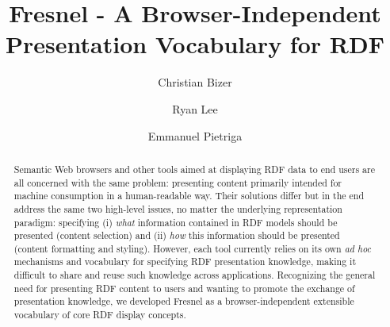 \documentclass{llncs}
\begin{document}
%
\newcommand{\rdf}[1]{{\small \texttt{#1}}}

\frontmatter          %
%
\pagestyle{headings}  %
\mainmatter              %
%
\title{Fresnel - A Browser-Independent Presentation Vocabulary for RDF}
%
%
\author{Christian Bizer \and Ryan Lee \and Emmanuel Pietriga}
%
%
%

\maketitle

\begin{abstract}
Semantic Web browsers and other tools aimed at displaying RDF data to end users are all concerned with the same problem: presenting content primarily intended for machine consumption in a human-readable way. Their solutions differ but in the end address the same two high-level issues, no matter the underlying representation paradigm: specifying (i) {\em what} information contained in RDF models should be presented (content selection) and (ii) {\em how} this information should be presented (content formatting and styling). However, each tool currently relies on its own {\em ad hoc} mechanisms and vocabulary for specifying RDF presentation knowledge, making it difficult to share and reuse such knowledge across applications. Recognizing the general need for presenting RDF content to users and wanting to promote the exchange of presentation knowledge, we developed Fresnel as a browser-independent extensible vocabulary of core RDF display concepts.
\end{abstract}
\end{document}
